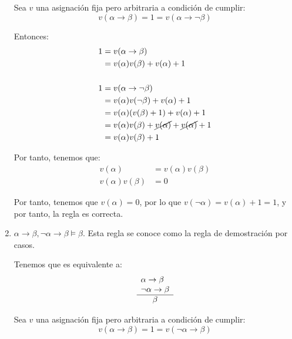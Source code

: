 \begin{ejercicio*}
\begin{enumerate}
        Sea $v$ una asignación fija pero arbitraria a condición de cumplir:
        \begin{equation*}
            v(\alpha\rightarrow\beta)=1=v(\alpha\rightarrow\lnot\beta)
        \end{equation*}

        Entonces:
        \begin{align*}
            1 &= v(\alpha\rightarrow\beta)\\
            &= v(\alpha)v(\beta)+v(\alpha)+1\\ \\
            1 &= v(\alpha\rightarrow\lnot\beta)\\
            &= v(\alpha)v(\lnot\beta)+v(\alpha)+1\\
            &= v(\alpha)(v(\beta)+1)+v(\alpha)+1\\
            &= v(\alpha)v(\beta)+\cancel{v(\alpha)}+\cancel{v(\alpha)}+1\\
            &= v(\alpha)v(\beta)+1
        \end{align*}

        Por tanto, tenemos que:
        \begin{align*}
            v(\alpha)&= v(\alpha)v(\beta)\\
            v(\alpha)v(\beta)&= 0
        \end{align*}

        Por tanto, tenemos que $v(\alpha)=0$, por lo que
        $v(\lnot\alpha)=v(\alpha)+1=1$, y por tanto, la regla es correcta.

        \item $\alpha\rightarrow\beta,\lnot\alpha\rightarrow\beta\vDash\beta$. Esta regla se conoce como la regla de demostración por casos.
        
        Tenemos que es equivalente a:
        \begin{equation*}
            \begin{array}{l}
                \alpha\rightarrow\beta\\
                \lnot\alpha\rightarrow\beta\\ \hline
                \multicolumn{1}{c}{\beta}
            \end{array}
        \end{equation*}

        Sea $v$ una asignación fija pero arbitraria a condición de cumplir:
        \begin{equation*}
            v(\alpha\rightarrow\beta)=1=v(\lnot\alpha\rightarrow\beta)
        \end{equation*}


\end{enumerate}
\end{ejercicio*}
